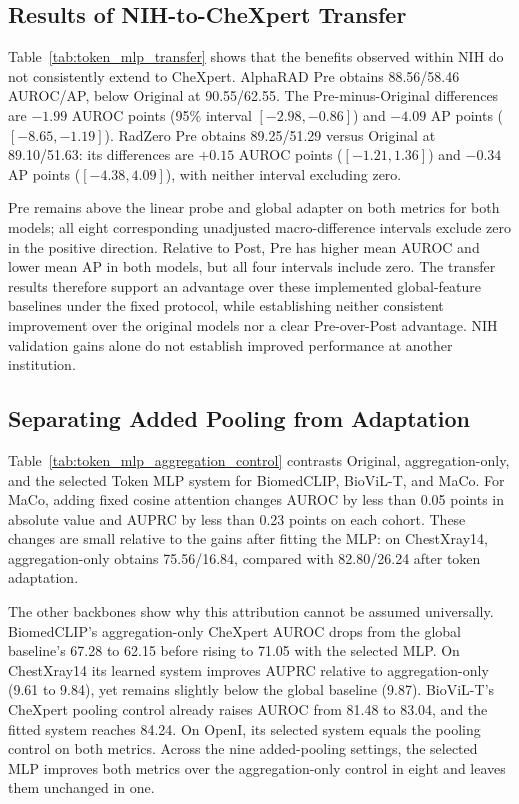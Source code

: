 \documentclass[10pt,twocolumn,letterpaper]{article}
\begin{document}
\subsection{Results of NIH-to-CheXpert Transfer}
\label{sec:transfer_results}

Table~\ref{tab:token_mlp_transfer} shows that the benefits observed within NIH do not consistently extend to CheXpert. AlphaRAD Pre obtains 88.56/58.46 AUROC/AP, below Original at 90.55/62.55. The Pre-minus-Original differences are $-1.99$ AUROC points (95\% interval $[-2.98,-0.86]$) and $-4.09$ AP points ($[-8.65,-1.19]$). RadZero Pre obtains 89.25/51.29 versus Original at 89.10/51.63: its differences are $+0.15$ AUROC points ($[-1.21,1.36]$) and $-0.34$ AP points ($[-4.38,4.09]$), with neither interval excluding zero.

Pre remains above the linear probe and global adapter on both metrics for both models; all eight corresponding unadjusted macro-difference intervals exclude zero in the positive direction. Relative to Post, Pre has higher mean AUROC and lower mean AP in both models, but all four intervals include zero. The transfer results therefore support an advantage over these implemented global-feature baselines under the fixed protocol, while establishing neither consistent improvement over the original models nor a clear Pre-over-Post advantage. NIH validation gains alone do not establish improved performance at another institution.

\subsection{Separating Added Pooling from Adaptation}

Table~\ref{tab:token_mlp_aggregation_control} contrasts Original, aggregation-only, and the selected Token MLP system for BiomedCLIP, BioViL-T, and MaCo. For MaCo, adding fixed cosine attention changes AUROC by less than 0.05 points in absolute value and AUPRC by less than 0.23 points on each cohort. These changes are small relative to the gains after fitting the MLP: on ChestXray14, aggregation-only obtains 75.56/16.84, compared with 82.80/26.24 after token adaptation.

The other backbones show why this attribution cannot be assumed universally. BiomedCLIP's aggregation-only CheXpert AUROC drops from the global baseline's 67.28 to 62.15 before rising to 71.05 with the selected MLP. On ChestXray14 its learned system improves AUPRC relative to aggregation-only (9.61 to 9.84), yet remains slightly below the global baseline (9.87). BioViL-T's CheXpert pooling control already raises AUROC from 81.48 to 83.04, and the fitted system reaches 84.24. On OpenI, its selected system equals the pooling control on both metrics. Across the nine added-pooling settings, the selected MLP improves both metrics over the aggregation-only control in eight and leaves them unchanged in one.
\end{document}
